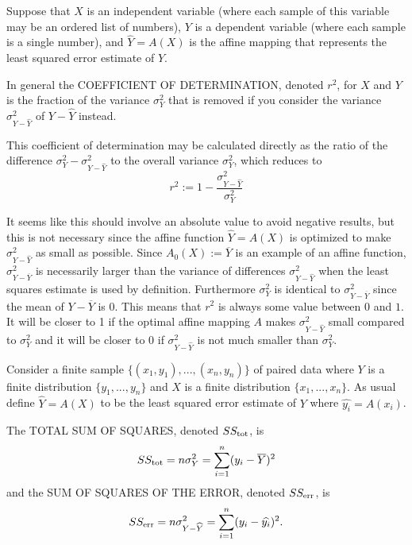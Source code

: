 \begin{definition}
Suppose that $X$ is an independent variable (where each sample of this variable may be an ordered list of numbers), $Y$ is a dependent variable (where each sample is a single number), and $\widehat{Y}=A(X)$ is the affine mapping that represents the least squared error estimate of $Y$.

In general the COEFFICIENT OF DETERMINATION, denoted $r^2$, for $X$ and $Y$ is the fraction of the variance $\sigma_Y^2$ that is removed if you consider the variance $\sigma_{Y-\widehat{Y}}^2$ of $Y-\widehat{Y}$ instead.
\end{definition}

This coefficient of determination may be calculated directly as the ratio of the difference $\sigma_Y^2-\sigma_{Y-\widehat{Y}}^2$ to the overall variance $\sigma_Y^2$, which reduces to
$$r^2:=1-\frac{\sigma_{Y-\widehat{Y}}^2}{\sigma_Y^2}$$

It seems like this should involve an absolute value to avoid negative results, but this is not necessary since the affine function $\widehat{Y}=A(X)$ is optimized to make $\sigma_{Y-\widehat{Y}}^2$ as small as possible. Since $A_0(X):=\overline{Y}$ is an example of an affine function, $\sigma_{Y-\overline{Y}}^2$ is necessarily larger than the variance of differences $\sigma_{Y-\widehat{Y}}^2$ when the least squares estimate is used by definition. Furthermore $\sigma_Y^2$ is identical to $\sigma_{Y-\overline{Y}}^2$ since the mean of $Y-\overline{Y}$ is 0. This means that $r^2$ is always some value between $0$ and $1$. It will be closer to 1 if the optimal affine mapping $A$ makes $\sigma_{Y-\widehat{Y}}^2$ small compared to $\sigma_Y^2$ and it will be closer to 0 if $\sigma_{Y-\widehat{Y}}^2$ is not much smaller than $\sigma_Y^2$.

\begin{definition}
Consider a finite sample $\{(x_1,y_1),...,(x_n,y_n)\}$ of paired data where $Y$ is a finite distribution $\{y_1,...,y_n\}$ and $X$ is a finite distribution $\{x_1,...,x_n\}$. As usual define $\widehat{Y}=A(X)$ to be the least squared error estimate of $Y$ where $\widehat{y_i}=A(x_i)$.

The TOTAL SUM OF SQUARES, denoted $SS_{\text{tot}}$, is
$$SS_{\text{tot}}=n\sigma_Y^2=\sum_{i=1}^n(y_i-\overline{Y})^2$$
and the SUM OF SQUARES OF THE ERROR, denoted $SS_{\text{err}}$, is
$$SS_{\text{err}}=n\sigma_{Y-\widehat{Y}}^2=\sum_{i=1}^n(y_i-\widehat{y_i})^2.$$
\end{definition}


